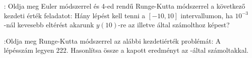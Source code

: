 :
Oldja meg Euler módszerrel és 4-ed rendű Runge-Kutta módszerrel a 
következő kezdeti érték feladatot:
Hány lépést kell tenni a $[-10,10]$ intervallumon, ha $10^{-3}$-nál kevesebb 
eltérést akarunk $y(10)$-re az  illetve   által számolthoz képest? 

:Oldja meg Runge-Kutta módszerrel az alábbi kezdetiérték problémát:
A lépésszám legyen 222. Hasonlítsa össze a kapott eredményt az 
-által számoltakkal.

